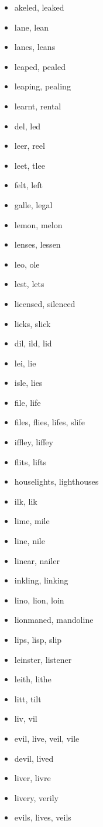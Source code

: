 \documentclass[a4wide,11pt]{report}
\begin{document}
\begin{itemize}
  \item akeled, leaked
  \item lane, lean
  \item lanes, leans
  \item leaped, pealed
  \item leaping, pealing
  \item learnt, rental
  \item del, led
  \item leer, reel
  \item leet, tlee
  \item felt, left
  \item galle, legal
  \item lemon, melon
  \item lenses, lessen
  \item leo, ole
  \item lest, lets
  \item licensed, silenced
  \item licks, slick
  \item dil, ild, lid
  \item lei, lie
  \item isle, lies
  \item file, life
  \item files, flies, lifes, slife
  \item iffley, liffey
  \item flits, lifts
  \item houselights, lighthouses
  \item ilk, lik
  \item lime, mile
  \item line, nile
  \item linear, nailer
  \item inkling, linking
  \item lino, lion, loin
  \item lionmaned, mandoline
  \item lips, lisp, slip
  \item leinster, listener
  \item leith, lithe
  \item litt, tilt
  \item liv, vil
  \item evil, live, veil, vile
  \item devil, lived
  \item liver, livre
  \item livery, verily
  \item evils, lives, veils

\end{itemize}
\end{document}
